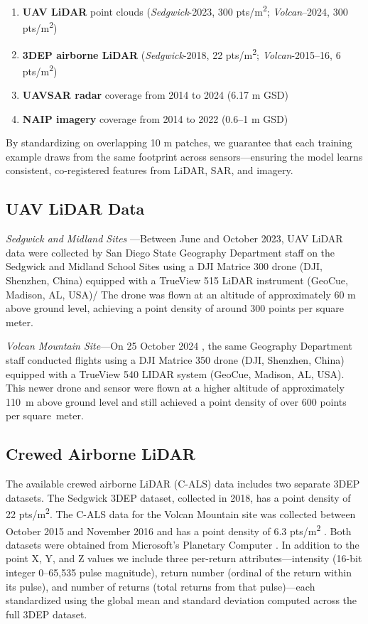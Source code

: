 \documentclass[12pt]{report}
\begin{document}
\begin{enumerate}[leftmargin=*]
    \item \textbf{UAV LiDAR} point clouds (\textit{Sedgwick}-2023, 300 pts/m\textsuperscript{2}; \textit{Volcan}–2024, 300 pts/m\textsuperscript{2})
    \item \textbf{3DEP airborne LiDAR} (\textit{Sedgwick}-2018, 22 pts/m\textsuperscript{2}; \textit{Volcan}-2015–16, 6 pts/m\textsuperscript{2})
    \item \textbf{UAVSAR radar} coverage from 2014 to 2024 (6.17 m GSD)
    \item \textbf{NAIP imagery} coverage from 2014 to 2022 (0.6–1 m GSD)
\end{enumerate}

By standardizing on overlapping 10 m patches, we guarantee that each training example draws from the same footprint across sensors—ensuring the model learns consistent, co-registered features from LiDAR, SAR, and imagery.

\subsection{UAV LiDAR Data}
\textit{Sedgwick and Midland Sites
}---Between June and October 2023, UAV LiDAR data were collected by San Diego State Geography Department staff on the Sedgwick and Midland School Sites using a DJI Matrice 300 drone (DJI, Shenzhen, China)
 equipped with a TrueView 515 LiDAR instrument (GeoCue, Madison, AL, USA)/
The drone was flown at an altitude of approximately 60 m above ground level, achieving a point density of around 300 points per square meter.

\textit{Volcan Mountain Site}---On 25 October 2024
, the same Geography Department staff conducted flights using a DJI Matrice 350 drone (DJI, Shenzhen, China) equipped with a TrueView 540 LIDAR system (GeoCue, Madison, AL, USA). This newer drone and sensor were flown at a higher altitude of approximately \mbox{110 m} above ground level and still achieved a point density of over 600 points per \mbox{square meter}.

\subsection{Crewed Airborne LiDAR}
The available crewed airborne LiDAR (C-ALS) data includes two separate 3DEP datasets. The Sedgwick 3DEP dataset, collected in 2018, has a point density of 22 pts/m\textsuperscript{2}. The C-ALS data for the Volcan Mountain site was collected between October 2015 and November 2016 and has a point density of 6.3 pts/m\textsuperscript{2} \citep{usgs_usgs_2016}. Both datasets were obtained from Microsoft's Planetary Computer \citep{us_geological_survey_3d_elevation_program_usgs_2023,planetary_computer}.
In addition to the point X, Y, and Z values we include three per-return attributes—intensity (16-bit integer 0–65,535 pulse magnitude), return number (ordinal of the return within its pulse), and number of returns (total returns from that pulse)—each standardized using the global mean and standard deviation computed across the full 3DEP dataset.
\end{document}
